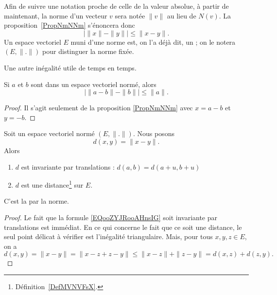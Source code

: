 \begin{normaltext}	
Afin de suivre une notation proche de celle de la valeur absolue, à partir de maintenant, la norme d'un vecteur $v$ sera notée $\| v\|$ au lieu de $N(v)$. La proposition~\ref{PropNmNNm} s'énoncera donc
\begin{equation}
\big| \| x \|-\| y \| \big|\leq \| x-y \|.
\end{equation}
Un espace vectoriel $E$ muni d'une norme est, on l'a déjà dit, un ; on le notera $(E,\| . \|)$ pour distinguer la norme fixée.
\end{normaltext}

Une autre inégalité utile de temps en temps.
\begin{corollary}       \label{CORooDFBGooAqVRfS}
    Si \( a\) et \( b\) sont dans un espace vectoriel normé, alors
    \begin{equation}
        \big| \| a-b \|-\| b \| \big|\leq \| a \|.
    \end{equation}
\end{corollary}

\begin{proof}
    Il s'agit seulement de la proposition \ref{PropNmNNm} avec \( x=a-b\) et \( y=-b\).
\end{proof}

\begin{lemmaDef}        \label{LEMooWGBJooYTDYIK}
    Soit un espace vectoriel normé \( (E,\| . \|)\). Nous posons
    \begin{equation}        \label{EQooZYJRooAHnsIG}
        d(x,y)=\| x-y \| .
    \end{equation}
    Alors
    \begin{enumerate}
        \item       \label{ITEMooLITDooPeReOk}
            \( d\) est invariante par translations : $d(a,b)=d(a+u,b+u)$
        \item
            \( d\) est une distance\footnote{Définition~\ref{DefMVNVFsX}.} sur \( E\).
    \end{enumerate}
    C'est la  par la norme.
\end{lemmaDef}

\begin{proof}
    Le fait que la formule \eqref{EQooZYJRooAHnsIG} soit invariante par translations est immédiat. En ce qui concerne le fait que ce soit une distance, le seul point délicat à vérifier est l'inégalité triangulaire. Mais, pour tous \( x, y, z \in E\), on a
    \begin{equation}
            d(x,y)=\| x-y \| = \| x-z+z-y \|  \leq\| x - z \|+\| z - y\| =d(x,z)+d(z,y).
    \end{equation}
\end{proof}

